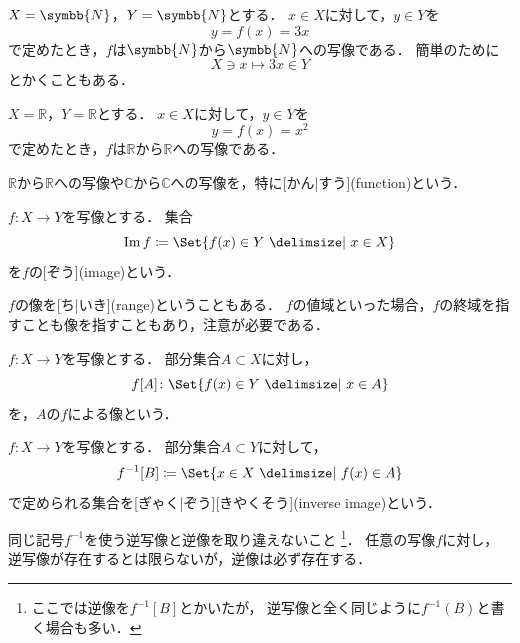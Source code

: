 \documentclass[../sotsu.tex]{subfiles}
\begin{document}
\begin{example}
    $X = \symbb{N}$，$Y = \symbb{N}$とする．
    $x \in X$に対して，$y \in Y$を
    \[ y = f(x) = 3x \]
    で定めたとき，$f$は$\symbb{N}$から$\symbb{N}$への写像である．
    簡単のために
    \[ X \ni x \mapsto 3x \in Y \]
    とかくこともある．
\end{example}

\begin{example}
    $X = ℝ$，$Y = ℝ$とする．
    $x \in X$に対して，$y \in Y$を
    \[ y = f(x) = x^2 \]
    で定めたとき，$f$は$ℝ$から$ℝ$への写像である．

    $ℝ$から$ℝ$への写像や$ℂ$から$ℂ$への写像を，特に[かん|すう](function)という．
\end{example}

\begin{definition}[像]
    \label{dfn:image}
    $f \colon X \to Y$を写像とする．
    集合
    \begin{equation}
        \image f  \coloneq  \Set{ f(x) \in Y  \given  x \in X }
    \end{equation}
    を$f$の[ぞう](image)という．
\end{definition}

$f$の像を[ち|いき](range)ということもある．
$f$の値域といった場合，$f$の終域を指すことも像を指すこともあり，注意が必要である．

\begin{definition}[部分集合の像]
    $f \colon X \to Y$を写像とする．
    部分集合$A \subset X$に対し，
    \begin{equation}
        f[A] \colon \Set{  f(x) \in Y  \given  x \in A  }
    \end{equation}
    を，$A$の$f$による像という．
\end{definition}

\begin{definition}[逆像]
    $f \colon X \to Y$を写像とする．
    部分集合$A \subset Y$に対して，
    \begin{equation}
        f^{-1}[B] \coloneq \Set{  x \in X  \given  f(x) \in A  }
    \end{equation}
    で定められる集合を[ぎゃく|ぞう][きやくそう](inverse image)という．
\end{definition}
同じ記号$f^{-1}$を使う逆写像と逆像を取り違えないこと%
\footnote{
    ここでは逆像を$f^{-1}[B]$とかいたが，
    逆写像と全く同じように$f^{-1}(B)$と書く場合も多い．
}．
任意の写像$f$に対し，逆写像が存在するとは限らないが，逆像は必ず存在する．
\end{document}

